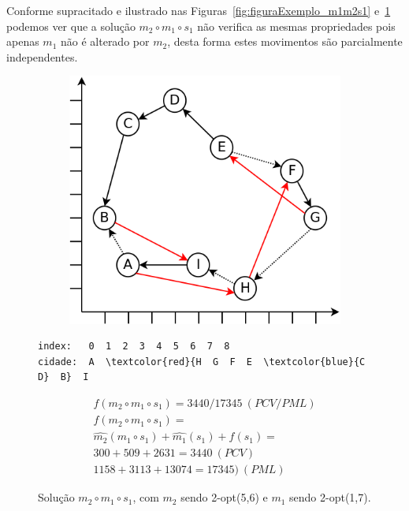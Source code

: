 Conforme supracitado e ilustrado nas Figuras~\ref{fig:figuraExemplo_m1m2s1} e~\ref{fig:figuraExemplo_m2m1s1} podemos ver que a solução $m_2 \circ m_1 \circ s_1$ não verifica as mesmas propriedades pois apenas $m_1$ não é alterado por $m_2$, desta forma estes movimentos são parcialmente independentes.

\begin{figure}[ht]
    \begin{minipage}{.475\textwidth}
        \begin{subfigure}[t]{1\textwidth} %
            \includegraphics[width=1\linewidth]{figuras/pml/exemplo-rodolfo-2opt-5-6-1-7.png}
        \end{subfigure}
    \end{minipage}
    \begin{minipage}{.475\textwidth}
\begin{Verbatim}[commandchars=\\\{\}]
index:   0  1  2  3  4  5  6  7  8
cidade:  A  \textcolor{red}{H  G  F  E  \textcolor{blue}{C  D}  B}  I
\end{Verbatim}
\begin{gather*}
f(m_2 \circ m_1 \circ s_1) = 3440/17345 \ (PCV/PML) \\
f(m_2 \circ m_1 \circ s_1) = \\
\widehat{m_2}(m_1 \circ s_1) + \widehat{m_1}(s_1) + f(s_1) = \\
300 + 509 + 2631= 3440 \ (PCV) \\
1158 + 3113 + 13074 = 17345) \ (PML)
\end{gather*}
    \end{minipage}
    \caption{Solução $m_2 \circ m_1 \circ s_1$, com $m_2$ sendo 2-opt(5,6) e $m_1$ sendo 2-opt(1,7).}
    \label{fig:figuraExemplo_m2m1s1}
\end{figure}

